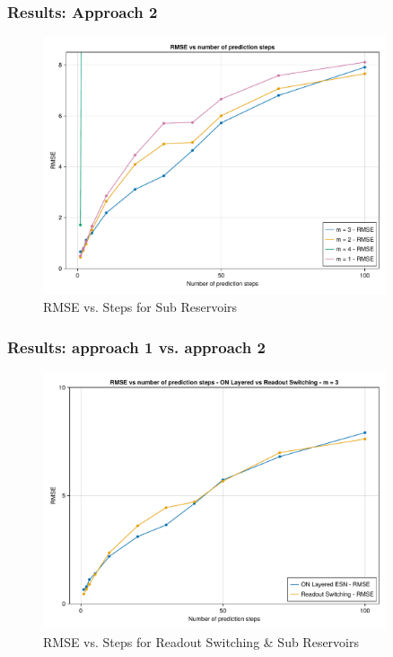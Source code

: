 \documentclass{beamer}
\begin{document}
\begin{frame}
    \frametitle{Results: Approach 2}

    \begin{figure}
        \centering
        \includegraphics[width=0.9\textwidth]{OPESN_RMSE_vs_steps.pdf}
        \caption{RMSE vs. Steps for Sub Reservoirs}
        \label{fig:OPESN_rmse_vs_steps}
    \end{figure}
\end{frame}

\begin{frame}
    \frametitle{Results: approach 1 vs. approach 2}

    \begin{figure}
        \centering
        \includegraphics[width=0.9\textwidth]{ON_layered_vs_readout_switching_m_3.pdf}
        \caption{RMSE vs. Steps for Readout Switching \& Sub Reservoirs}
        \label{fig:OPESN_vs_readout_switching}
    \end{figure}
\end{frame}
\end{document}
